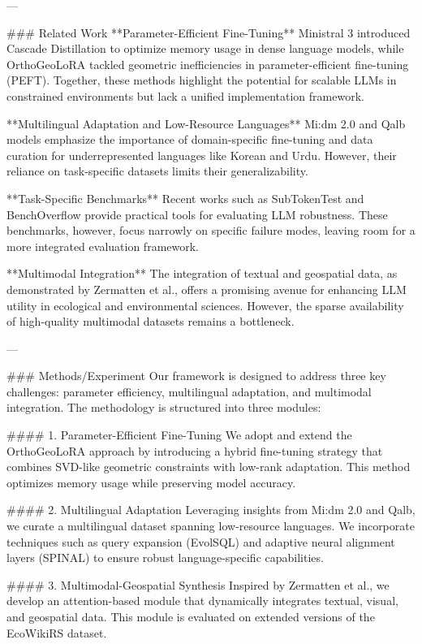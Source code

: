 ---

### Related Work  
**Parameter-Efficient Fine-Tuning**  
Ministral 3 introduced Cascade Distillation to optimize memory usage in dense language models, while OrthoGeoLoRA tackled geometric inefficiencies in parameter-efficient fine-tuning (PEFT). Together, these methods highlight the potential for scalable LLMs in constrained environments but lack a unified implementation framework.

**Multilingual Adaptation and Low-Resource Languages**  
Mi:dm 2.0 and Qalb models emphasize the importance of domain-specific fine-tuning and data curation for underrepresented languages like Korean and Urdu. However, their reliance on task-specific datasets limits their generalizability.

**Task-Specific Benchmarks**  
Recent works such as SubTokenTest and BenchOverflow provide practical tools for evaluating LLM robustness. These benchmarks, however, focus narrowly on specific failure modes, leaving room for a more integrated evaluation framework.

**Multimodal Integration**  
The integration of textual and geospatial data, as demonstrated by Zermatten et al., offers a promising avenue for enhancing LLM utility in ecological and environmental sciences. However, the sparse availability of high-quality multimodal datasets remains a bottleneck.

---

### Methods/Experiment  
Our framework is designed to address three key challenges: parameter efficiency, multilingual adaptation, and multimodal integration. The methodology is structured into three modules:

#### 1. Parameter-Efficient Fine-Tuning
We adopt and extend the OrthoGeoLoRA approach by introducing a hybrid fine-tuning strategy that combines SVD-like geometric constraints with low-rank adaptation. This method optimizes memory usage while preserving model accuracy.

#### 2. Multilingual Adaptation
Leveraging insights from Mi:dm 2.0 and Qalb, we curate a multilingual dataset spanning low-resource languages. We incorporate techniques such as query expansion (EvolSQL) and adaptive neural alignment layers (SPINAL) to ensure robust language-specific capabilities.

#### 3. Multimodal-Geospatial Synthesis
Inspired by Zermatten et al., we develop an attention-based module that dynamically integrates textual, visual, and geospatial data. This module is evaluated on extended versions of the EcoWikiRS dataset.

